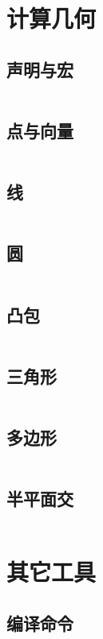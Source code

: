 \documentclass[12pt, a4paper, oneside]{ctexart}
\begin{document}
\begin{multicols}{2}
        \newpage

        \section{计算几何}
        \subsection{声明与宏}
        \inputminted{cpp}{src/geometry/define.cpp}
        \subsection{点与向量}
        \inputminted{cpp}{src/geometry/vector.cpp}
        \subsection{线}
        \inputminted{cpp}{src/geometry/line.cpp}
        \subsection{圆}
        \inputminted{cpp}{src/geometry/circle.cpp}
        \subsection{凸包}
        \inputminted{cpp}{src/geometry/convex.cpp}
        \subsection{三角形}
        \inputminted{cpp}{src/geometry/triangle.cpp}
        \subsection{多边形}
        \inputminted{cpp}{src/geometry/polygon.cpp}
        \subsection{半平面交}
        \inputminted{cpp}{src/geometry/half-plane.cpp}
        \newpage

        \section{其它工具}
        \subsection{编译命令}
        \inputminted{bash}{src/tools/compile.sh}

\end{multicols}
\end{document}
